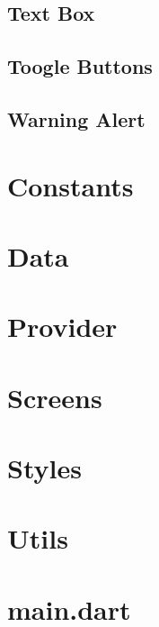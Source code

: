 \subsection{Text Box}
\label{subsec:text-box}

\subsection{Toogle Buttons}
\label{subsec:toogle-buttons}

\subsection{Warning Alert}
\label{subsec:warning-alert}

\section{Constants}
\label{sec:constants}

\section{Data}
\label{sec:data}

\section{Provider}
\label{sec:provider}

\section{Screens}
\label{sec:screens}

\section{Styles}
\label{sec:styles}


\section{Utils}
\label{sec:utils}

\section{main.dart}
\label{sec:main}


